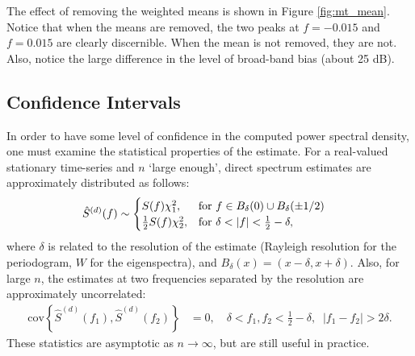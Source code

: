 The effect of removing the weighted means is shown in Figure \ref{fig:mt_mean}.  Notice that when the means are removed, the two peaks at $f=-0.015$ and $f=0.015$ are clearly discernible.  When the mean is not removed, they are not.  Also, notice the large difference in the level of broad-band bias (about 25 dB).

\subsection{Confidence Intervals} 

In order to have some level of confidence in the computed power spectral density, one must examine the statistical properties of the estimate.  For a real-valued stationary time-series and $n$ `large enough', direct spectrum estimates are approximately distributed as follows:
\begin{align}
    \hat{S}^{(d)}(f) & \sim \begin{cases}
                                S(f) \chi^2_1, & \text{for }f \in B_\delta(0) \cup B_\delta(\pm1/2)\\
                                \frac{1}{2} S(f) \chi^2_2, & \text{for } \delta < |f| < \tfrac{1}{2}-\delta,
                            \end{cases}\index{direct spectral estimator!distribution of}
\end{align}
where $\delta$ is related to the resolution of the estimate (Rayleigh resolution for the periodogram, $W$ for the eigenspectra), and $B_\delta(x)=(x-\delta, x+\delta)$.   Also, for large $n$, the estimates at two frequencies separated by the resolution are approximately uncorrelated:
\begin{align}
    \text{cov}\left\{\hat{S}^{(d)}(f_1), \hat{S}^{(d)}(f_2)\right\} & = 0, \quad \delta < f_1,f_2 < \tfrac{1}{2}-\delta,\;\; |f_1-f_2|>2\delta.
\end{align}
These statistics are asymptotic as $n\to\infty$, but are still useful in practice.

